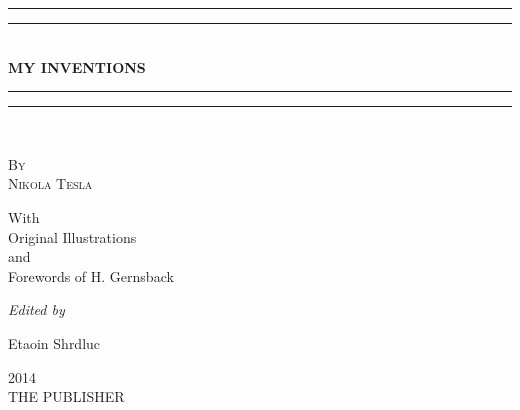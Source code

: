 \documentclass[a4paper,12pt,english,twoside,openright]{memoir}
\begin{document}
	\nocite{*}
	\frontmatter
\thispagestyle{empty}
{ 
\centering 
\vspace*{\baselineskip}

\rule{\textwidth}{1.6pt}\vspace*{-\baselineskip}\vspace*{2pt} 
\rule{\textwidth}{0.4pt}\\[\baselineskip] 

\vspace*{1cm}
{\HUGE 	\bfseries
	MY INVENTIONS\\[\baselineskip] 
}

\vspace*{1cm}

\rule{\textwidth}{0.4pt}\vspace*{-\baselineskip}\vspace{3.2pt} 
\rule{\textwidth}{1.6pt}\\[\baselineskip] 

\vspace*{.2cm}

\scshape 
{\Large
	By\\ \textsc{Nikola Tesla} \\
} 
\vspace*{1cm}

With\\ Original Illustrations\\ and\\ 
Forewords of H. Gernsback\\[\baselineskip]


\vspace*{4\baselineskip}

\emph{Edited by} \\
{\large Etaoin Shrdluc\par} 


\vfill %


{\scshape 2014} \\[0.3\baselineskip] %
{\large THE PUBLISHER}\par %
\vspace{1.5cm}
}
\end{document}

